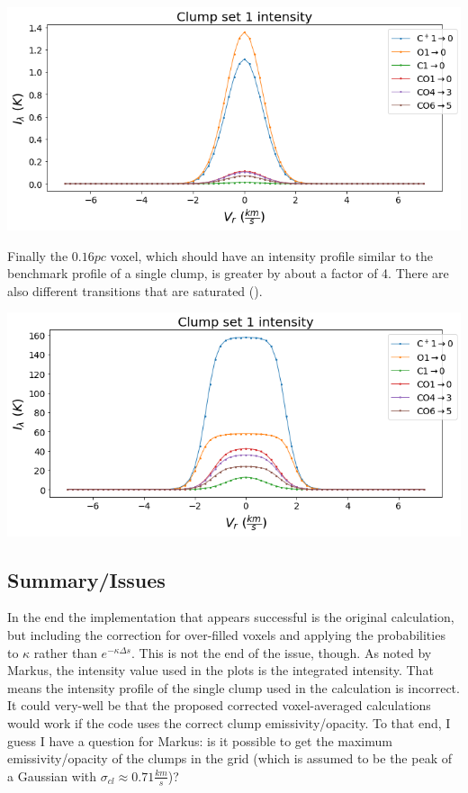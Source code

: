\documentclass[a4paper]{article}
\begin{document}
    \includegraphics*[width=\linewidth]{voxel_convergence_fv-calc-opacity-pexp.png}

    Finally the \(0.16 pc\) voxel, which should have an intensity profile similar to the benchmark profile of a single clump, is greater by about a factor of 4.
    There are also different transitions that are saturated ().

    \includegraphics*[width=\linewidth]{voxel_single-clump_fv-calc-opacity-pexp.png}

    \subsection{Summary/Issues}

    In the end the implementation that appears successful is the original calculation, but including the correction for over-filled voxels and applying the probabilities to \(\kappa\) rather than \(e^{-\kappa \Delta s}\).
    This is not the end of the issue, though.
    As noted by Markus, the intensity value used in the plots is the integrated intensity.
    That means the intensity profile of the single clump used in the calculation is incorrect.
    It could very-well be that the proposed corrected voxel-averaged calculations would work if the code uses the correct clump emissivity/opacity.
    To that end, I guess I have a question for Markus: is it possible to get the maximum emissivity/opacity of the clumps in the grid (which is assumed to be the peak of a Gaussian with \(\sigma_{cl} \approx 0.71 \frac{km}{s}\))?
\end{document}
